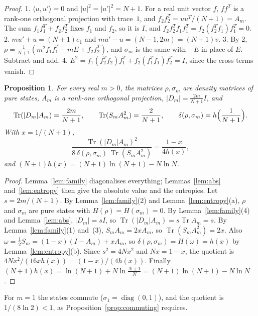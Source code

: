 \documentclass[11pt]{amsart}
\newtheorem{proposition}[theorem]{Proposition}
\theoremstyle{definition}\newtheorem{definition}[theorem]{Definition}
\theoremstyle{remark}\newtheorem{remark}[theorem]{Remark}
\DeclareMathOperator{\Tr}{Tr}
\DeclareMathOperator{\diag}{diag}
\newcommand{\abs}[1]{\lvert #1\rvert}
\begin{document}
\begin{proof}
1. \(\langle u,u'\rangle=0\) and \(\abs{u}^2=\abs{u'}^2=N+1\). For a real unit vector \(f\), \(ff^{T}\) is a rank-one orthogonal projection with trace~\(1\), and \(f_2f_2^{T}=uu^{T}/(N+1)=A_m\). The sum \(f_1f_1^{T}+f_2f_2^{T}\) fixes \(f_1\) and \(f_2\), so it is \(I\), and \(f_2f_2^{T}f_1f_1^{T}=f_2(f_2^{T}f_1)f_1^{T}=0\).
2. \(mu'+u=(N+1)e_1\) and \(mu'-u=(N-1,2m)=(N+1)v\).
3. By 2, \(\rho=\frac{1}{N+1}(m^2f_1f_1^{T}+mE+f_2f_2^{T})\), and \(\sigma_m\) is the same with \(-E\) in place of \(E\). Subtract and add.
4. \(E^2=f_1(f_2^{T}f_2)f_1^{T}+f_2(f_1^{T}f_1)f_2^{T}=I\), since the cross terms vanish.
\end{proof}

\begin{proposition}\label{prop:closed}
For every real \(m>0\), the matrices \(\rho,\sigma_m\) are density matrices of pure states, \(A_m\) is a rank-one orthogonal projection, \(\abs{D_m}=\frac{2m}{N+1}I\), and
\[
\Tr(\abs{D_m}A_m)=\frac{2m}{N+1},\qquad \Tr(S_mA_m^2)=\frac{2}{N+1},\qquad \delta(\rho,\sigma_m)=h\Bigl(\frac{1}{N+1}\Bigr).
\]
With \(x=1/(N+1)\),
\begin{equation}\label{eq:closed}
\frac{\Tr(\abs{D_m}A_m)^2}{8\,\delta(\rho,\sigma_m)\,\Tr(S_mA_m^2)}=\frac{1-x}{4h(x)},
\end{equation}
and \((N+1)h(x)=(N+1)\ln(N+1)-N\ln N\).
\end{proposition}

\begin{proof}
Lemma~\ref{lem:family} diagonalises everything; Lemmas~\ref{lem:abs} and~\ref{lem:entropy} then give the absolute value and the entropies. Let \(s=2m/(N+1)\). By Lemma~\ref{lem:family}(2) and Lemma~\ref{lem:entropy}(a), \(\rho\) and \(\sigma_m\) are pure states with \(H(\rho)=H(\sigma_m)=0\). By Lemma~\ref{lem:family}(4) and Lemma~\ref{lem:abs}, \(\abs{D_m}=sI\), so \(\Tr(\abs{D_m}A_m)=s\Tr A_m=s\). By Lemma~\ref{lem:family}(1) and~(3), \(S_mA_m=2xA_m\), so \(\Tr(S_mA_m^2)=2x\). Also \(\omega=\frac12S_m=(1-x)(I-A_m)+xA_m\), so \(\delta(\rho,\sigma_m)=H(\omega)=h(x)\) by Lemma~\ref{lem:entropy}(b). Since \(s^2=4Nx^2\) and \(Nx=1-x\), the quotient is \(4Nx^2/(16xh(x))=(1-x)/(4h(x))\). Finally \((N+1)h(x)=\ln(N+1)+N\ln\frac{N+1}{N}=(N+1)\ln(N+1)-N\ln N\).
\end{proof}

For \(m=1\) the states commute (\(\sigma_1=\diag(0,1)\)), and the quotient is \(1/(8\ln2)<1\), as Proposition~\ref{prop:commuting} requires.
\end{document}

